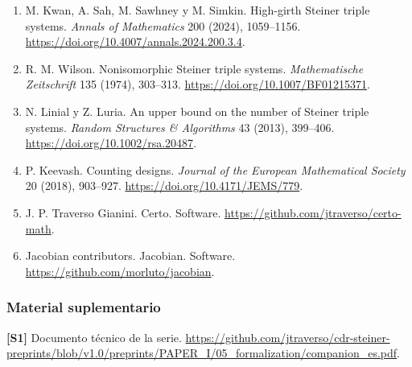 \documentclass[spanish,11pt,a4paper]{article}
\begin{document}
\begin{enumerate}
\item
  M. Kwan, A. Sah, M. Sawhney y M. Simkin. High-girth Steiner triple systems. \emph{Annals of Mathematics} 200 (2024), 1059--1156. \url{https://doi.org/10.4007/annals.2024.200.3.4}.
\item
  R. M. Wilson. Nonisomorphic Steiner triple systems. \emph{Mathematische Zeitschrift} 135 (1974), 303--313. \url{https://doi.org/10.1007/BF01215371}.
\item
  N. Linial y Z. Luria. An upper bound on the number of Steiner triple systems. \emph{Random Structures \& Algorithms} 43 (2013), 399--406. \url{https://doi.org/10.1002/rsa.20487}.
\item
  P. Keevash. Counting designs. \emph{Journal of the European Mathematical Society} 20 (2018), 903--927. \url{https://doi.org/10.4171/JEMS/779}.
\item
  J. P. Traverso Gianini. Certo. Software. \url{https://github.com/jtraverso/certo-math}.
\item
  Jacobian contributors. Jacobian. Software. \url{https://github.com/morluto/jacobian}.
\end{enumerate}

\subsubsection{Material suplementario}\label{material-suplementario}

\textbf{{[}S1{]}} Documento técnico de la serie. \url{https://github.com/jtraverso/cdr-steiner-preprints/blob/v1.0/preprints/PAPER_I/05_formalization/companion_es.pdf}.
\end{document}
